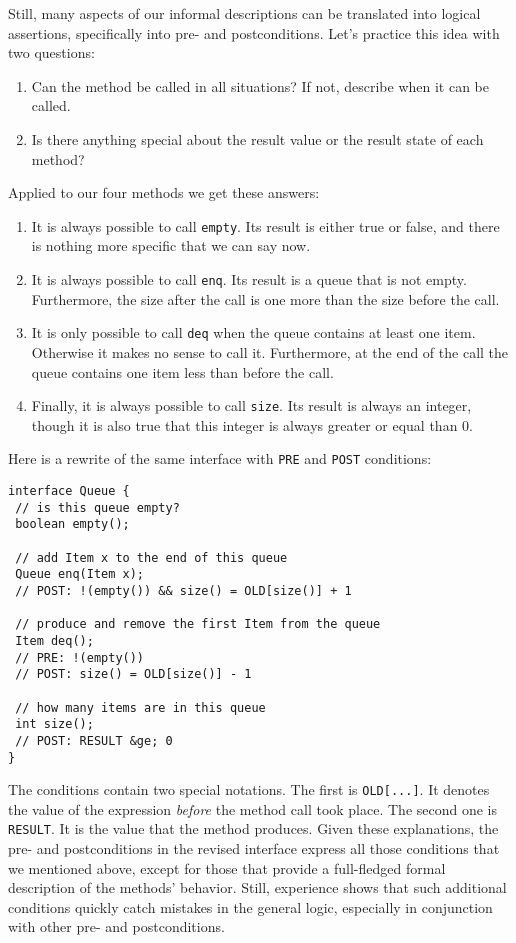 \documentclass[11pt]{article}
\begin{document}
Still, many aspects of our informal descriptions can be translated into
logical assertions, specifically into pre- and postconditions. Let's practice
this idea with two questions: 
\begin{enumerate}
\item Can the method be called in all situations? If not, describe when it can be
called.
\item Is there anything special about the result value or the result state of each
method?
\end{enumerate}
Applied to our four methods we get these answers: 
\begin{enumerate}
\item It is always possible to call {\tt empty}. Its result is either true
or false, and there is nothing more specific that we can say now.
\item It is always possible to call {\tt enq}. Its result is a queue that
is not empty. Furthermore, the size after the call is one more than the size
before the call. 

\item It is only possible to call {\tt deq} when the queue contains at
least one item. Otherwise it makes no sense to call it. Furthermore, at the end
of the call the queue contains one item less than before the call. 

\item Finally, it is always possible to call {\tt size}. Its result is
always an integer, though it is also true that this integer is always greater or
equal than 0. 

\end{enumerate}


Here is a rewrite of the same interface with {\tt PRE} and
  {\tt POST} conditions: 
\begin{verbatim}
interface Queue {
 // is this queue empty? 
 boolean empty();
 
 // add Item x to the end of this queue
 Queue enq(Item x); 
 // POST: !(empty()) && size() = OLD[size()] + 1

 // produce and remove the first Item from the queue
 Item deq(); 
 // PRE: !(empty()) 
 // POST: size() = OLD[size()] - 1

 // how many items are in this queue 
 int size();
 // POST: RESULT &ge; 0
}
\end{verbatim}
The conditions contain two special notations. The first is
 {\tt OLD[...]}. It denotes the value of the expression {\em before}
 the method call took place. The second one is {\tt RESULT}. It is the
 value that the method produces. Given these explanations, the pre- and
 postconditions in the revised interface express all those conditions that we
 mentioned above, except for those that provide a full-fledged formal
 description of the methods' behavior. Still, experience shows that such
 additional conditions quickly catch mistakes in the general logic, especially
 in conjunction with other pre- and postconditions. 
\end{document}
